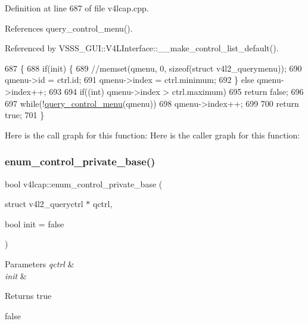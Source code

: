 Definition at line 687 of file v4lcap.\+cpp.



References query\+\_\+control\+\_\+menu().



Referenced by V\+S\+S\+S\+\_\+\+G\+U\+I\+::\+V4\+L\+Interface\+::\+\_\+\+\_\+make\+\_\+control\+\_\+list\+\_\+default().


\begin{DoxyCode}
687                                                                                                            
           \{
688     \textcolor{keywordflow}{if}(init) \{
689         \textcolor{comment}{//memset(qmenu, 0, sizeof(struct v4l2\_querymenu));}
690         qmenu->id = ctrl.id;
691         qmenu->index = ctrl.minimum;
692     \} \textcolor{keywordflow}{else} qmenu->index++;
693 
694     \textcolor{keywordflow}{if}((\textcolor{keywordtype}{int}) qmenu->index > ctrl.maximum)
695         \textcolor{keywordflow}{return} \textcolor{keyword}{false};
696 
697     \textcolor{keywordflow}{while}(!\hyperlink{classv4lcap_aa23f5ba6c1828dc3af8258d8a33b95e4}{query\_control\_menu}(qmenu))
698         qmenu->index++;
699 
700     \textcolor{keywordflow}{return} \textcolor{keyword}{true};
701 \}
\end{DoxyCode}
Here is the call graph for this function\+:
Here is the caller graph for this function\+:
\mbox{\label{classv4lcap_a8d3a9ba9c833aca83f339ba1a9965bf0}} 
\subsubsection{\texorpdfstring{enum\+\_\+control\+\_\+private\+\_\+base()}{enum\_control\_private\_base()}}
{\footnotesize\ttfamily bool v4lcap\+::enum\+\_\+control\+\_\+private\+\_\+base (\begin{DoxyParamCaption}\item[{struct v4l2\+\_\+queryctrl $\ast$}]{qctrl,  }\item[{bool}]{init = {\ttfamily false} }\end{DoxyParamCaption})}


\begin{DoxyParams}{Parameters}
{\em qctrl} & \\
\hline
{\em init} & \\
\hline
\end{DoxyParams}
\begin{DoxyReturn}{Returns}
true 

false 
\end{DoxyReturn}


